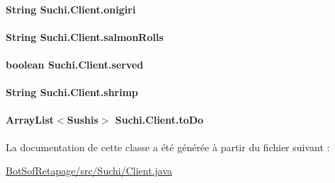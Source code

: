 \paragraph[{onigiri}]{\setlength{\rightskip}{0pt plus 5cm}String Suchi.\+Client.\+onigiri\hspace{0.3cm}{\ttfamily [private]}}\label{classSuchi_1_1Client_a0d8eba93c20ea516917b12db42233ea4}
\hypertarget{classSuchi_1_1Client_a8724d79f7d9f7e2720ae6be2331475d4}{}
\paragraph[{salmon\+Rolls}]{\setlength{\rightskip}{0pt plus 5cm}String Suchi.\+Client.\+salmon\+Rolls\hspace{0.3cm}{\ttfamily [package]}}\label{classSuchi_1_1Client_a8724d79f7d9f7e2720ae6be2331475d4}
\hypertarget{classSuchi_1_1Client_a543ce771d09e264df72783f30bcb2a05}{}
\paragraph[{served}]{\setlength{\rightskip}{0pt plus 5cm}boolean Suchi.\+Client.\+served\hspace{0.3cm}{\ttfamily [private]}}\label{classSuchi_1_1Client_a543ce771d09e264df72783f30bcb2a05}
\hypertarget{classSuchi_1_1Client_af49dfab5d81b322967e58bc85aa2cd81}{}
\paragraph[{shrimp}]{\setlength{\rightskip}{0pt plus 5cm}String Suchi.\+Client.\+shrimp\hspace{0.3cm}{\ttfamily [package]}}\label{classSuchi_1_1Client_af49dfab5d81b322967e58bc85aa2cd81}
\hypertarget{classSuchi_1_1Client_ad8f1efef85f217db94de5bfb30ff6a60}{}
\paragraph[{to\+Do}]{\setlength{\rightskip}{0pt plus 5cm}Array\+List$<${\bf Sushis}$>$ Suchi.\+Client.\+to\+Do\hspace{0.3cm}{\ttfamily [private]}}\label{classSuchi_1_1Client_ad8f1efef85f217db94de5bfb30ff6a60}


La documentation de cette classe a été générée à partir du fichier suivant \+:\begin{DoxyCompactItemize}
\item 
\hyperlink{BotSofRetapage_2src_2Suchi_2Client_8java}{Bot\+Sof\+Retapage/src/\+Suchi/\+Client.\+java}\end{DoxyCompactItemize}
